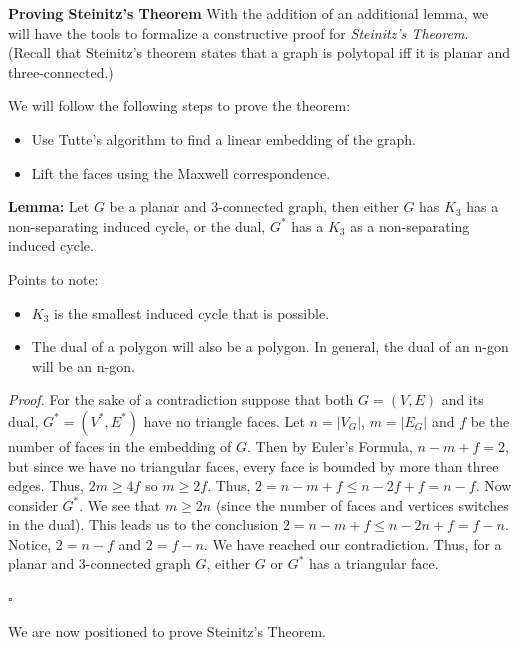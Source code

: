 \documentclass{article}
\begin{document}
  
  \noindent \textbf{Proving Steinitz's Theorem}
  \newline \noindent With the addition of an additional lemma, we will have the tools to formalize a constructive proof for \textit{Steinitz's Theorem}. (Recall that Steinitz's theorem states that a graph is polytopal iff it is planar and three-connected.)
  
  \medskip \noindent We will follow the following steps to prove the theorem:
  \begin{itemize}
      \item Use Tutte's algorithm to find a linear embedding of the graph.
      \item Lift the faces using the Maxwell correspondence.
  \end{itemize}
  \medskip  \noindent \textbf{Lemma:} Let $G$ be a planar and 3-connected graph, then either $G$ has $K_3$ has a non-separating induced cycle, or the dual, $G^*$ has a $K_3$ as a non-separating induced cycle. 
  
  \medskip \noindent Points to note:
  \begin{itemize}
      \item $K_3$ is the smallest induced cycle that is possible.
      \item The dual of a polygon will also be a polygon. In general, the dual of an n-gon will be an n-gon.
  \end{itemize}
  \smallskip  \noindent \textit{Proof.} For the sake of a contradiction suppose that both $G=(V,E)$ and its dual, $G^*=(V^*,E^*)$ have no triangle faces. Let $n=|V_G|$, $m=|E_G|$ and $f$ be the number of faces in the embedding of $G$. Then by Euler's Formula, $n-m+f=2$, but since we have no triangular faces, every face is bounded by more than three edges. Thus, $2m \geq 4f$ so $m \geq 2f$. Thus, $2=n-m+f \leq n -2f +f = n-f$. Now consider $G^*$. We see that $m \geq 2n$ (since the number of faces and vertices switches in the dual). This leads us to the conclusion $2=n-m+f \leq n-2n+f=f-n$. Notice, $2=n-f$ and $2=f-n$. We have reached our contradiction. Thus, for a planar and 3-connected graph $G$, either $G$ or $G^*$ has a triangular face. 
 \vspace{0.5mm} \begin{flushright} $\square$ \end{flushright}
  
 \medskip \noindent We are now positioned to prove Steinitz's Theorem.
  
\end{document}
